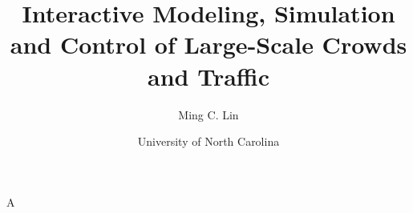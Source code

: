 \documentclass[11pt]{article}
\title{Interactive Modeling, Simulation and Control of Large-Scale Crowds and Traffic}
\author{Ming C. Lin}
\date{University of North Carolina}
\begin{document}
\maketitle
A
\end{document}
